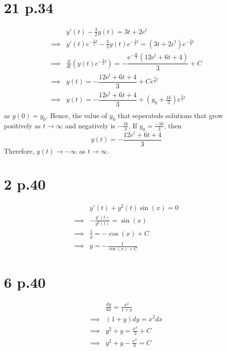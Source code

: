 \documentclass[11pt]{article}
\begin{document}
\section*{21 p.34}
\begin{equation*}
    \begin{aligned}
        &y'(t)-\frac{3}{2}y(t) = 3t + 2e^{t} \\
        \implies &y'(t)e^{-\frac{3}{2}t} -\frac{3}{2}y(t)e^{-\frac{3}{2}t} =  (3t + 2e^{t})e^{-\frac{3}{2}t} \\
        \implies &\frac{d}{dt} (y(t)e^{-\frac{3}{2}t}) =  -\dfrac{\mathrm{e}^{-\frac{3t}{2}}\left(12\mathrm{e}^t+6t+4\right)}{3} + C\\
        \implies &y(t) = -\dfrac{12\mathrm{e}^t+6t+4}{3} + Ce^{\frac{3}{2}t} \\
        \implies &y(t) =  -\dfrac{12\mathrm{e}^t+6t+4}{3} +\left(y_0+\frac{16}{3}\right)e^{\frac{3}{2}t} \\
    \end{aligned}
\end{equation*}
as $y(0)=y_0$. Hence, the value of $y_0$ that seperateds solutions that grow positively as $t\to \infty$ and 
negatively is $-\frac{16}{3}$. If $y_0 = \frac{-16}{3}$, then 
\[
    y(t) = - \frac{12e^t + 6t+4}{3}    
\]
Therefore, $y(t) \to - \infty $ as $t \to \infty$.
\newpage
\section*{2 p.40}
\begin{equation*}
    \begin{aligned}
        &y'(t) +y^2(t) \sin(x) = 0 \\
        \implies &-\frac{y'(t)}{y^2(t)} = \sin(x) \\
        \implies &\frac{1}{y} = -\cos(x) + C \\
        \implies &y = -\frac{1}{\cos(x)+C}
    \end{aligned}
\end{equation*}
\newpage
\section*{6 p.40}
\begin{equation*}
    \begin{aligned}
        &\frac{dy}{dx} = \frac{x^2}{1+y} \\
        \implies & (1+y)dy = x^2dx \\
        \implies &y^2+y = \frac{x^3}{3} + C \\
        \implies &y^2+y - \frac{x^3}{3} = C
    \end{aligned}
\end{equation*}
\newpage
\end{document}
